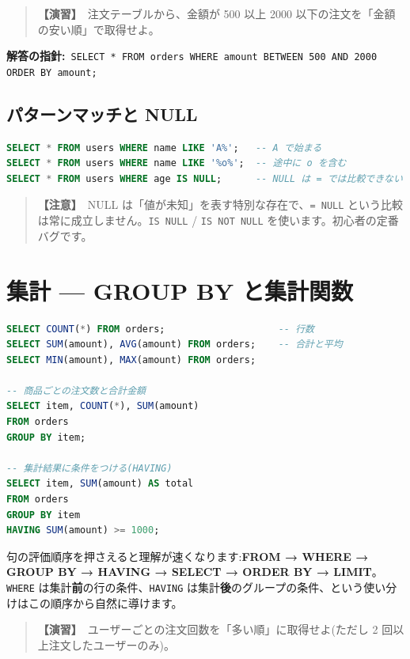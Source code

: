 \documentclass{article}
\begin{document}
\begin{quote}
\textbf{【演習】}\ 注文テーブルから、金額が 500 以上 2000 以下の注文を「金額の安い順」で取得せよ。
\end{quote}

\textbf{解答の指針:}\ \texttt{SELECT * FROM orders WHERE amount BETWEEN 500 AND 2000 ORDER BY amount;}

\subsection{パターンマッチと NULL}

\begin{lstlisting}[language=SQL]
SELECT * FROM users WHERE name LIKE 'A%';   -- A で始まる
SELECT * FROM users WHERE name LIKE '%o%';  -- 途中に o を含む
SELECT * FROM users WHERE age IS NULL;      -- NULL は = では比較できない
\end{lstlisting}

\begin{quote}
\textbf{【注意】}\ NULL は「値が未知」を表す特別な存在で、\texttt{= NULL} という比較は常に成立しません。\texttt{IS NULL} / \texttt{IS NOT NULL} を使います。初心者の定番バグです。
\end{quote}

\section{集計 — GROUP BY と集計関数}

\begin{lstlisting}[language=SQL]
SELECT COUNT(*) FROM orders;                    -- 行数
SELECT SUM(amount), AVG(amount) FROM orders;    -- 合計と平均
SELECT MIN(amount), MAX(amount) FROM orders;

-- 商品ごとの注文数と合計金額
SELECT item, COUNT(*), SUM(amount)
FROM orders
GROUP BY item;

-- 集計結果に条件をつける(HAVING)
SELECT item, SUM(amount) AS total
FROM orders
GROUP BY item
HAVING SUM(amount) >= 1000;
\end{lstlisting}

句の評価順序を押さえると理解が速くなります:\textbf{FROM → WHERE → GROUP BY → HAVING → SELECT → ORDER BY → LIMIT}。\texttt{WHERE} は集計\textbf{前}の行の条件、\texttt{HAVING} は集計\textbf{後}のグループの条件、という使い分けはこの順序から自然に導けます。

\begin{quote}
\textbf{【演習】}\ ユーザーごとの注文回数を「多い順」に取得せよ(ただし 2 回以上注文したユーザーのみ)。
\end{quote}
\end{document}
